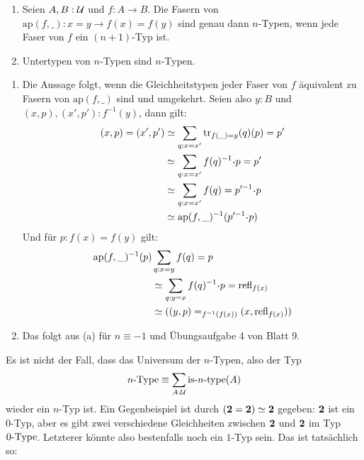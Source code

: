 \begin{bemerkung}
  \begin{enumerate}
  \item Seien $A,B:\mathcal{U}$ und $f:A\to B$. Die Fasern von $\mathrm{ap}(f,\_):x=y\to f(x)=f(y)$ sind genau dann $n$-Typen, wenn jede Faser von $f$ ein $(n+1)$-Typ ist.
  \item Untertypen von $n$-Typen sind $n$-Typen.
  \end{enumerate}
\end{bemerkung}
\begin{beweis}
  \begin{enumerate}
  \item Die Aussage folgt, wenn die Gleichheitstypen jeder Faser von $f$ äquivalent zu Fasern von $\mathrm{ap}(f,\_)$ sind und umgekehrt.
    Seien also $y:B$ und $(x,p),(x',p'):f^{-1}(y)$, dann gilt:
    \begin{align*}
      (x,p)=(x',p') &\simeq \sum_{q:x=x'}\transp_{f(\_)=y}(q)(p)=p' \\
                    &\simeq \sum_{q:x=x'}f(q)^{-1}\kon p=p' \\
                    &\simeq \sum_{q:x=x'}f(q)=p'^{-1}\kon p \\
                    &\simeq \mathrm{ap}(f,\_)^{-1}(p'^{-1}\kon p)
    \end{align*}
    Und für $p:f(x)=f(y)$ gilt:
    \begin{align*}
      \mathrm{ap}(f,\_)^{-1}(p) &\sum_{q:x=y}f(q)=p \\
      &\simeq \sum_{q:y=x}f(q)^{-1}\kon p=\refl_{f(x)}\\
                                &\simeq ((y,p)=_{f^{-1}(f(x))}(x,\refl_{f(x)}))
    \end{align*}
  \item Das folgt aus (a) für $n\equiv -1$ und Übungsaufgabe 4 von Blatt 9.
  \end{enumerate}
\end{beweis}

Es ist nicht der Fall, dass das Universum der $n$-Typen, also der Typ
\[
  n\hbox{-}\mathrm{Type}\equiv\sum_{A:\mathcal{U}}\mathrm{is}\mbox{-}{n}\mbox{-}\mathrm{type}(A)
\]
wieder ein $n$-Typ ist. Ein Gegenbeispiel ist durch $(\mathbf{2}=\mathbf{2})\simeq \mathbf{2}$ gegeben: $\mathbf{2}$ ist ein $0$-Typ, aber es gibt zwei verschiedene Gleichheiten zwischen $\mathbf{2}$ und $\mathbf{2}$ im Typ $0\mbox{-}\mathrm{Type}$.
Letzterer könnte also bestenfalls noch ein $1$-Typ sein. Das ist tatsächlich so:

